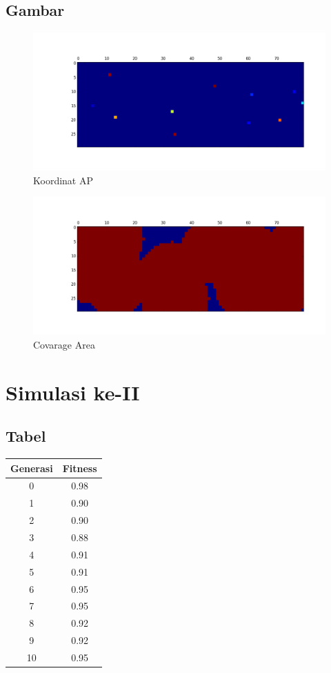 \documentclass[11pt,a4paper,titlepage]{report}
\begin{document}
	\subsection*{Gambar}
	\begin{figure}[h]
	\centering
	\includegraphics[width=0.9\linewidth]{apLoc_01}
	\caption{Koordinat AP}
	\label{fig:apLoc_01}
	\end{figure}
	\begin{figure}[h]
	\centering
	\includegraphics[width=0.9\linewidth]{coverage_01}
	\caption{Covarage Area}
	\label{fig:coverage_01}
	\end{figure}
	\newpage
	\section*{Simulasi ke-II}
	\subsection*{Tabel}
	\begin{tabular}{|c|c|}
		\hline Generasi & Fitness \\ 
		\hline 0 & 0.98 \\ 
		\hline 1 & 0.90 \\ 
		\hline 2 & 0.90 \\ 
		\hline 3 & 0.88 \\ 
		\hline 4 & 0.91 \\ 
		\hline 5 & 0.91 \\ 
		\hline 6 & 0.95 \\ 
		\hline 7 & 0.95 \\ 
		\hline 8 & 0.92 \\ 
		\hline 9 & 0.92 \\ 
		\hline 10 & 0.95 \\
		\hline
	\end{tabular} 
\end{document}

